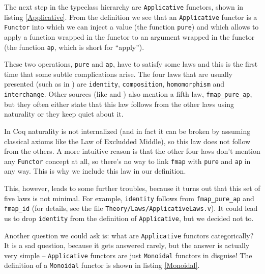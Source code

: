 \documentclass[declaration,inz,english,shortabstract]{iithesis}
\newcommand{\m}[1]{\texttt{#1}}
\begin{document}
The next step in the typeclass hierarchy are \m{Applicative} functors, shown in listing \ref{Applicative}. From the definition we see that an \m{Applicative} functor is a \m{Functor} into which we can inject a value (the function \m{pure}) and which allows to apply a function wrapped in the functor to an argument wrapped in the functor (the function \m{ap}, which is short for ``apply'').

These two operations, \m{pure} and \m{ap}, have to satisfy some laws and this is the first time that some subtle complications arise. The four laws that are usually presented (such as in \cite{LYAH}) are \m{identity}, \m{composition}, \m{homomorphism} and \m{interchange}. Other sources (like \cite{HackageApplicative} and \cite{WikibooksApplicative}) also mention a fifth law, \m{fmap\_pure\_ap}, but they often either state that this law follows from the other laws using naturality or they keep quiet about it.

In Coq naturality is not internalized (and in fact it can be broken by assuming classical axioms like the Law of Excludded Middle), so this law does not follow from the others. A more intuitive reason is that the other four laws don't mention any \m{Functor} concept at all, so there's no way to link \m{fmap} with \m{pure} and \m{ap} in any way. This is why we include this law in our definition.

This, however, leads to some further troubles, because it turns out that this set of five laws is not minimal. For example, \m{identity} follows from \m{fmap\_pure\_ap} and \m{fmap\_id} (for details, see the file \m{Theory/Laws/ApplicativeLaws.v}). It could lead us to drop \m{identity} from the definition of \m{Applicative}, but we decided not to.


Another question we could ask is: what are \m{Applicative} functors categorically? It is a sad question, because it gets answered rarely, but the answer is actually very simple -- \m{Applicative} functors are just \m{Monoidal} functors in disguise! The definition of a \m{Monoidal} functor is shown in listing \ref{Monoidal}. 
\end{document}
